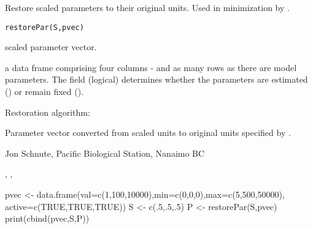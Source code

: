 \documentclass[letterpaper]{book}
\begin{document}
\begin{Description}\relax
Restore scaled parameters to their original units. Used in minimization by .
\end{Description}
\begin{Usage}
\begin{verbatim}restorePar(S,pvec)\end{verbatim}
\end{Usage}
\begin{Arguments}
\begin{ldescription}
\item[\code{S}] scaled parameter vector.
\item[\code{pvec}] a data frame comprising four columns - 
 and as many rows as there are model 
parameters. The  field (logical) determines whether the 
parameters are estimated () or remain fixed ().
\end{ldescription}
\end{Arguments}
\begin{Details}\relax
Restoration algorithm:  
\end{Details}
\begin{Value}
Parameter vector converted from scaled units to original units specified by .
\end{Value}
\begin{Author}\relax
Jon Schnute, Pacific Biological Station, Nanaimo BC
\end{Author}
\begin{SeeAlso}\relax
{}, , 
\end{SeeAlso}
\begin{Examples}
\begin{ExampleCode}
pvec <- data.frame(val=c(1,100,10000),min=c(0,0,0),max=c(5,500,50000),
        active=c(TRUE,TRUE,TRUE))
S    <- c(.5,.5,.5)
P    <- restorePar(S,pvec)
print(cbind(pvec,S,P))
\end{ExampleCode}
\end{Examples}
\end{document}
